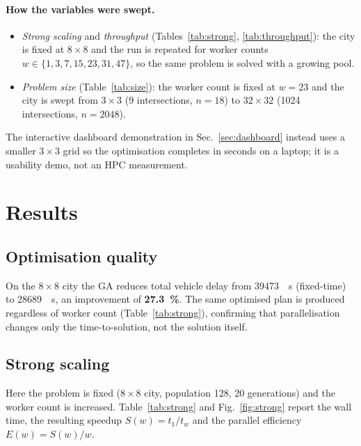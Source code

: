 \documentclass[11pt,a4paper]{article}
\begin{document}
\paragraph{How the variables were swept.}
\begin{itemize}
\item \emph{Strong scaling} and \emph{throughput} (Tables~\ref{tab:strong},
\ref{tab:throughput}): the city is fixed at $8\times8$ and the run is repeated
for worker counts $w \in \{1,3,7,15,23,31,47\}$, so the same problem is solved
with a growing pool.
\item \emph{Problem size} (Table~\ref{tab:size}): the worker count is fixed at
$w=23$ and the city is swept from $3\times3$ (9 intersections, $n=18$) to
$32\times32$ (1024 intersections, $n=2048$).
\end{itemize}
The interactive dashboard demonstration in Sec.~\ref{sec:dashboard} instead uses
a smaller $3\times3$ grid so the optimisation completes in seconds on a laptop;
it is a usability demo, not an HPC measurement.

\section{Results}
\subsection{Optimisation quality}
On the $8\times8$ city the GA reduces total vehicle delay from
\SI{39473}{\veh\second} (fixed-time) to \SI{28689}{\veh\second}, an improvement
of \textbf{\SI{27.3}{\percent}}. The same optimised plan is produced regardless
of worker count (Table~\ref{tab:strong}), confirming that parallelisation
changes only the time-to-solution, not the solution itself.

\subsection{Strong scaling}
\label{sec:strong}
Here the problem is fixed ($8\times8$ city, population 128, 20 generations) and
the worker count is increased. Table~\ref{tab:strong} and
Fig.~\ref{fig:strong} report the wall time, the resulting speedup
$S(w)=t_1/t_w$ and the parallel efficiency $E(w)=S(w)/w$.
\end{document}
